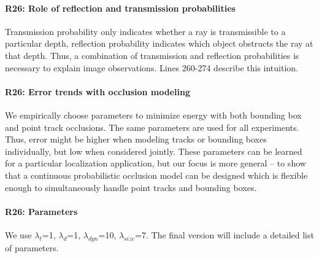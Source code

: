 \documentclass[10pt,twocolumn,letterpaper]{article}
\newcommand{\hili}[1]{\colorbox{yellow}{#1}}
\begin{document}
\vspace{-0.4cm}
\paragraph{R26: Role of reflection and transmission probabilities}
Transmission probability only indicates whether a ray is transmissible to a particular depth, reflection probability indicates which object obstructs the ray at that depth. Thus, a combination of transmission and reflection probabilities is necessary to explain image observations. Lines 260-274 describe this intuition.


\vspace{-0.4cm}
\paragraph{R26: Error trends with occlusion modeling}
We empirically choose parameters to minimize energy with both bounding box and point track occlusions. The same parameters are used for all experiments. Thus, error might be higher when modeling tracks or bounding boxes individually, but low when considered jointly. These parameters can be learned for a particular localization application, but our focus is more general -- to show that a continuous probabilistic occlusion model can be designed which is flexible enough to simultaneously handle point tracks and bounding boxes.

\vspace{-0.4cm}
\paragraph{R26: Parameters}
We use $\lambda_{t}$=1, $\lambda_{d}$=1, $\lambda_{dyn}$=10, $\lambda_{size}$=7. The final version will include a detailed list of parameters.



\end{document}
